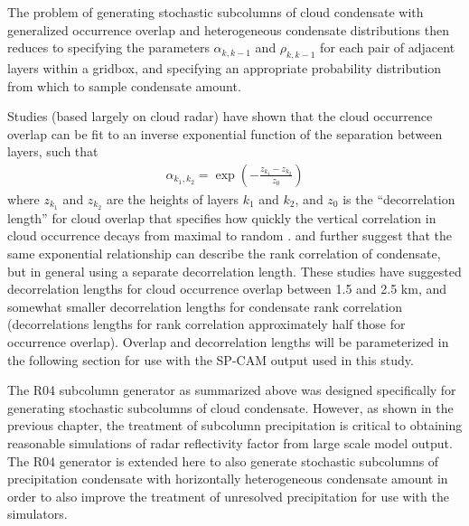 The problem of generating stochastic subcolumns of cloud condensate with
generalized occurrence overlap and heterogeneous condensate
distributions then reduces to specifying the parameters
\(\alpha_{k, k-1}\) and \(\rho_{k, k-1}\) for each pair of adjacent
layers within a gridbox, and specifying an appropriate probability
distribution from which to sample condensate amount.

Studies (based largely on cloud radar) have shown that the cloud
occurrence overlap can be fit to an inverse exponential function of the
separation between layers, such that \begin{equation}\begin{gathered} 
    \alpha_{k_1, k_2} = \exp\left(-\frac{z_{k_1} - z_{k_2}}{z_0}\right) 
\end{gathered}\label{eq:alpha_exponential}\end{equation} where
\(z_{k_1}\) and \(z_{k_2}\) are the heights of layers \(k_1\) and
\(k_2\), and \(z_0\) is the ``decorrelation length'' for cloud overlap
that specifies how quickly the vertical correlation in cloud occurrence
decays from maximal to random
\citep{hogan_and_illingworth_2000, mace_and_benson-troth_2002, raisanen_et_al_2004, pincus_et_al_2005, barker_2008, tompkins_and_digiuseppe_2015}.
\citet{raisanen_et_al_2004} and \citet{pincus_et_al_2005} further
suggest that the same exponential relationship can describe the rank
correlation of condensate, but in general using a separate decorrelation
length. These studies have suggested decorrelation lengths for cloud
occurrence overlap between 1.5 and 2.5 km, and somewhat smaller
decorrelation lengths for condensate rank correlation (decorrelations
lengths for rank correlation approximately half those for occurrence
overlap). Overlap and decorrelation lengths will be parameterized in the
following section for use with the SP-CAM output used in this study.

The R04 subcolumn generator as summarized above was designed
specifically for generating stochastic subcolumns of cloud condensate.
However, as shown in the previous chapter, the treatment of subcolumn
precipitation is critical to obtaining reasonable simulations of radar
reflectivity factor from large scale model output. The R04 generator is
extended here to also generate stochastic subcolumns of precipitation
condensate with horizontally heterogeneous condensate amount in order to
also improve the treatment of unresolved precipitation for use with the
simulators.

